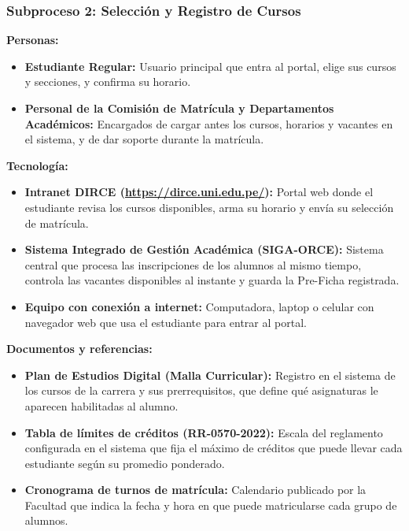 \subsubsection{Subproceso 2: Selección y Registro de Cursos}

\textbf{Personas:}
\begin{itemize}
    \item \textbf{Estudiante Regular:} Usuario principal que entra al portal, elige sus cursos y secciones, y confirma su horario.
    \item \textbf{Personal de la Comisión de Matrícula y Departamentos Académicos:} Encargados de cargar antes los cursos, horarios y vacantes en el sistema, y de dar soporte durante la matrícula.
\end{itemize}

\textbf{Tecnología:}
\begin{itemize}
    \item \textbf{Intranet DIRCE (\url{https://dirce.uni.edu.pe/}):} Portal web donde el estudiante revisa los cursos disponibles, arma su horario y envía su selección de matrícula.
    \item \textbf{Sistema Integrado de Gestión Académica (SIGA-ORCE):} Sistema central que procesa las inscripciones de los alumnos al mismo tiempo, controla las vacantes disponibles al instante y guarda la Pre-Ficha registrada.
    \item \textbf{Equipo con conexión a internet:} Computadora, laptop o celular con navegador web que usa el estudiante para entrar al portal.
\end{itemize}

\textbf{Documentos y referencias:}
\begin{itemize}
    \item \textbf{Plan de Estudios Digital (Malla Curricular):} Registro en el sistema de los cursos de la carrera y sus prerrequisitos, que define qué asignaturas le aparecen habilitadas al alumno.
    \item \textbf{Tabla de límites de créditos (RR-0570-2022):} Escala del reglamento configurada en el sistema que fija el máximo de créditos que puede llevar cada estudiante según su promedio ponderado.
    \item \textbf{Cronograma de turnos de matrícula:} Calendario publicado por la Facultad que indica la fecha y hora en que puede matricularse cada grupo de alumnos.
\end{itemize}
